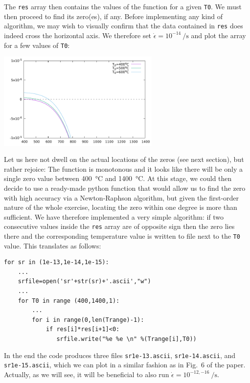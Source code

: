 The \lstinline|res| array then contains the values of the function for a given \lstinline|T0|.
We must then proceed to find its zero(es), if any. 
Before implementing any kind of algorithm, we may wish to visually confirm 
that the data contained in \lstinline|res| does indeed cross the horizontal axis. 
We therefore set $\dot\epsilon=10^{-14}~\si{\per\second}$ and plot the array 
for a few values of \lstinline|T0|:

\begin{center}
\includegraphics[width=8cm]{python_codes/fieldstone_167/lines/res.pdf}
\end{center}

Let us here not dwell on the actual locations of the zeros (see next section), 
but rather rejoice: The function is monotonous and it looks like there will 
be only a single zero value between 400~\si{\celsius} and 1400~\si{\celsius}. 
At this stage, we could then decide to use a ready-made python function that 
would allow us to find the zero with high accuracy via a Newton-Raphson algorithm, 
but given the first-order nature of the whole exercise, locating the 
zero within one degree is more than sufficient. We have therefore implemented
a very simple algorithm: if two consecutive values inside the \lstinline|res|
array are of opposite sign then the zero lies there and the corresponding 
temperature value is written to file next to the \lstinline|T0| value. 
This translates as follows:


\begin{lstlisting}
for sr in (1e-13,1e-14,1e-15):
    ...
    srfile=open('sr'+str(sr)+'.ascii',"w")
    ...
    for T0 in range (400,1400,1):
        ...
        for i in range(0,len(Trange)-1):
            if res[i]*res[i+1]<0: 
               srfile.write("%e %e \n" %(Trange[i],T0))
\end{lstlisting}

In the end the code produces three files
\verb|sr1e-13.ascii|, \verb|sr1e-14.ascii|, and \verb|sr1e-15.ascii|, 
which we can plot in a similar fashion as in Fig.~6 of the paper. 
Actually, as we will see, it will be beneficial to 
also run $\dot\epsilon=10^{-12,-16}~\si{\per\second}$.



